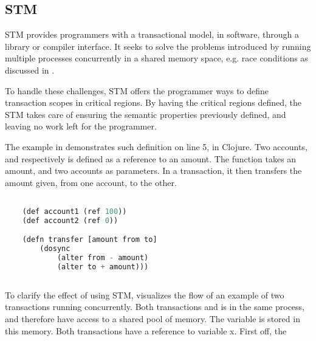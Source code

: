 \subsection{\acl{STM}}
\ac{STM} provides programmers with a transactional model, in software, through a library or compiler interface\cite{herlihy2011tm}. It seeks to solve the problems introduced by running multiple processes concurrently in a shared memory space, e.g. race conditions as discussed in . 

To handle these challenges, \ac{STM} offers the programmer ways to define transaction scopes in critical regions. By having the critical regions defined, the \ac{STM} takes care of ensuring the semantic properties previously defined, and leaving no work left for the programmer.

The example in  demonstrates such definition on line 5, in Clojure. Two accounts,  and  respectively is defined as a reference to an amount. The function  takes an amount, and two accounts as parameters. In a transaction, it then transfers the amount given, from one account, to the other.

\begin{lstlisting}[label=lst:stmexample,
  caption={STM in Clojure},
  language=Lisp,  
  showspaces=false,
  showtabs=false,
  breaklines=true,
  showstringspaces=false,
  breakatwhitespace=true,
  commentstyle=\color{greencomments},
  keywordstyle=\color{bluekeywords},
  stringstyle=\color{redstrings}]  % Start your code-block

	(def account1 (ref 100))
	(def account2 (ref 0))

	(defn transfer [amount from to]
    	(dosync
    		(alter from - amount)
    		(alter to + amount)))
       
\end{lstlisting}



To clarify the effect of using \ac{STM},  visualizes the flow of an example of two transactions running concurrently. Both transactions  and  is in the same process, and therefore have access to a shared pool of memory. The variable  is stored in this memory. Both transactions have a reference to variable x. First off, the 

